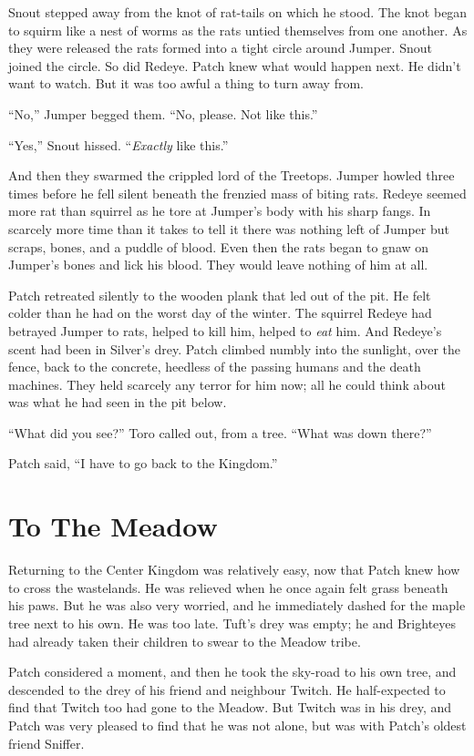 \documentclass[ebook,oneside,openany,12pt]{memoir}
\begin{document}
Snout stepped away from the knot of rat-tails on which he stood. The
knot began to squirm like a nest of worms as the rats untied
themselves from one another. As they were released the rats formed
into a tight circle around Jumper. Snout joined the circle. So did
Redeye. Patch knew what would happen next. He didn’t want to
watch. But it was too awful a thing to turn away from.

“No,” Jumper begged them. “No, please. Not like this.”

“Yes,” Snout hissed. “\emph{Exactly} like this.”

And then they swarmed the crippled lord of the Treetops. Jumper howled
three times before he fell silent beneath the frenzied mass of biting
rats. Redeye seemed more rat than squirrel as he tore at Jumper’s body
with his sharp fangs. In scarcely more time than it takes to tell it
there was nothing left of Jumper but scraps, bones, and a puddle of
blood. Even then the rats began to gnaw on Jumper’s bones and lick his
blood. They would leave nothing of him at all.

Patch retreated silently to the wooden plank that led out of the
pit. He felt colder than he had on the worst day of the winter. The
squirrel Redeye had betrayed Jumper to rats, helped to kill him,
helped to \emph{eat} him. And Redeye’s scent had been in Silver’s
drey. Patch climbed numbly into the sunlight, over the fence, back to
the concrete, heedless of the passing humans and the death
machines. They held scarcely any terror for him now; all he could
think about was what he had seen in the pit below.

“What did you see?” Toro called out, from a tree. “What was down
there?”

Patch said, “I have to go back to the Kingdom.”


\section{To The Meadow}

Returning to the Center Kingdom was relatively easy, now that Patch
knew how to cross the wastelands. He was relieved when he once again
felt grass beneath his paws. But he was also very worried, and he
immediately dashed for the maple tree next to his own. He was too
late. Tuft’s drey was empty; he and Brighteyes had already taken their
children to swear to the Meadow tribe.

Patch considered a moment, and then he took the sky-road to his own
tree, and descended to the drey of his friend and neighbour Twitch. He
half-expected to find that Twitch too had gone to the Meadow. But
Twitch was in his drey, and Patch was very pleased to find that he was
not alone, but was with Patch’s oldest friend Sniffer.
\end{document}
